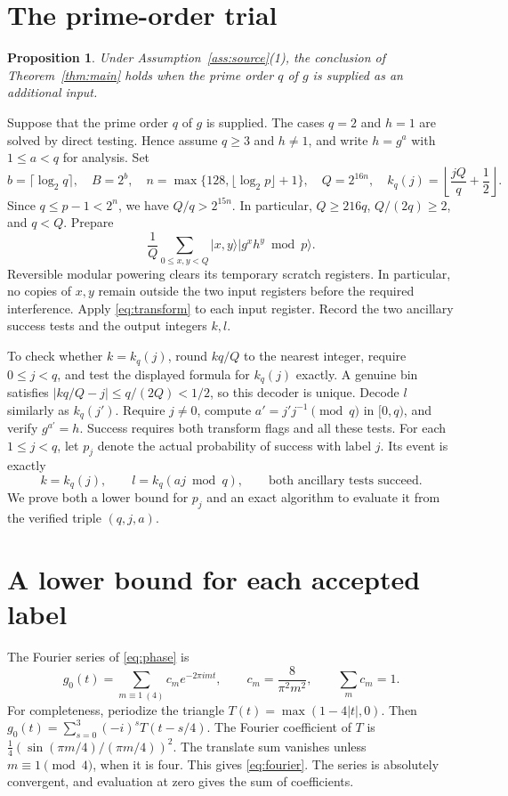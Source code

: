 \documentclass[11pt,reqno]{amsart}
\numberwithin{equation}{section}
\newtheorem{proposition}[theorem]{Proposition}
\theoremstyle{definition}
\theoremstyle{remark}
\newcommand{\ket}[1]{\lvert#1\rangle}
\begin{document}
\section{The prime-order trial}
\begin{proposition}\label{prop:prime}
Under Assumption~\ref{ass:source}(1), the conclusion of
Theorem~\ref{thm:main} holds when the prime order $q$ of $g$ is supplied
as an additional input.
\end{proposition}
Suppose that the prime order $q$ of $g$ is supplied. The cases $q=2$
and $h=1$ are solved by direct testing. Hence assume $q\ge3$ and
$h\ne1$, and write $h=g^a$ with $1\le a<q$ for analysis.
Set
\[
 b=\lceil\log_2q\rceil,\quad B=2^b,\quad
 n=\max\{128,\lfloor\log_2p\rfloor+1\},\quad Q=2^{16n},
 \quad k_q(j)=\left\lfloor\frac{jQ}{q}+\frac12\right\rfloor.
\]
Since $q\le p-1<2^n$, we have $Q/q>2^{15n}$. In particular,
$Q\ge216q$, $Q/(2q)\ge2$, and $q<Q$. Prepare
\begin{equation}\label{eq:input}
 \frac1Q\sum_{0\le x,y<Q}\ket{x,y}\ket{g^xh^y\bmod p}.
\end{equation}
Reversible modular powering clears its temporary scratch registers.
In particular, no copies of $x,y$ remain outside the two input registers
before the required interference. Apply \eqref{eq:transform} to each
input register. Record the two ancillary success tests and the output
integers $k,l$.

To check whether $k=k_q(j)$, round $kq/Q$ to the nearest integer, require
$0\le j<q$, and test the displayed formula for $k_q(j)$ exactly.
A genuine bin satisfies $|kq/Q-j|\le q/(2Q)<1/2$, so this decoder is
unique. Decode $l$ similarly as $k_q(j')$. Require $j\ne0$, compute
$a'=j'j^{-1}\pmod q$ in $[0,q)$, and verify $g^{a'}=h$.
Success requires both transform flags and all these tests.
For each $1\le j<q$, let $p_j$ denote the actual probability of success
with label $j$. Its event is exactly
\begin{equation}\label{eq:event}
 k=k_q(j),\qquad l=k_q(aj\bmod q),\qquad
 \text{both ancillary tests succeed}.
\end{equation}
We prove both a lower bound for $p_j$ and an exact algorithm to evaluate
it from the verified triple $(q,j,a)$.

\section{A lower bound for each accepted label}
The Fourier series of \eqref{eq:phase} is
\begin{equation}\label{eq:fourier}
 g_0(t)=\sum_{m\equiv1\ (4)}c_m e^{-2\pi i mt},\qquad
 c_m=\frac8{\pi^2m^2},\qquad \sum_m c_m=1.
\end{equation}
For completeness, periodize the triangle $T(t)=\max(1-4|t|,0)$.
Then $g_0(t)=\sum_{s=0}^3(-i)^sT(t-s/4)$.
The Fourier coefficient of $T$ is
$\frac14(\sin(\pi m/4)/(\pi m/4))^2$.
The translate sum vanishes unless $m\equiv1\pmod4$, when it is four.
This gives \eqref{eq:fourier}. The series is absolutely convergent,
and evaluation at zero gives the sum of coefficients.
\end{document}
